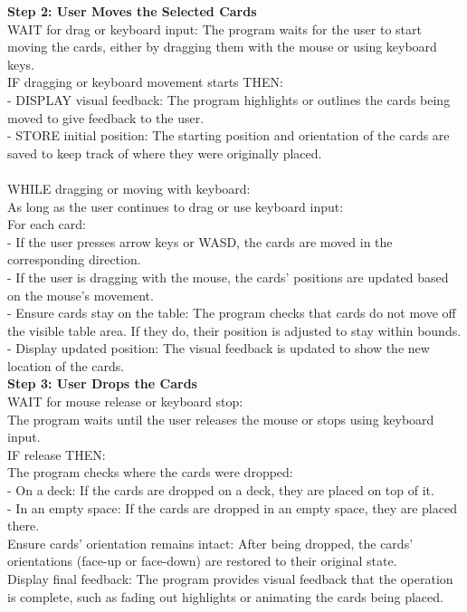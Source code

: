 \documentclass[a4paper]{project}
\begin{document}
				\textbf{Step 2: User Moves the Selected Cards} \\
				WAIT for drag or keyboard input: The program waits for the user to start moving the cards, either by dragging them with the mouse or using keyboard keys. \\
				IF dragging or keyboard movement starts THEN: \\
				- DISPLAY visual feedback: The program highlights or outlines the cards being moved to give feedback to the user. \\
				- STORE initial position: The starting position and orientation of the cards are saved to keep track of where they were originally placed. \\ \\
				WHILE dragging or moving with keyboard: \\
				As long as the user continues to drag or use keyboard input: \\
				For each card: \\
				- If the user presses arrow keys or WASD, the cards are moved in the corresponding direction. \\
				- If the user is dragging with the mouse, the cards' positions are updated based on the mouse's movement. \\
				- Ensure cards stay on the table: The program checks that cards do not move off the visible table area. If they do, their position is adjusted to stay within bounds. \\
				- Display updated position: The visual feedback is updated to show the new location of the cards. \\
				
				\textbf{Step 3: User Drops the Cards} \\
				WAIT for mouse release or keyboard stop: \\
				The program waits until the user releases the mouse or stops using keyboard input. \\
				IF release THEN: \\
				The program checks where the cards were dropped: \\
				- On a deck: If the cards are dropped on a deck, they are placed on top of it. \\
				- In an empty space: If the cards are dropped in an empty space, they are placed there. \\
				Ensure cards' orientation remains intact: After being dropped, the cards' orientations (face-up or face-down) are restored to their original state. \\
				Display final feedback: The program provides visual feedback that the operation is complete, such as fading out highlights or animating the cards being placed. \\
				
\end{document}
